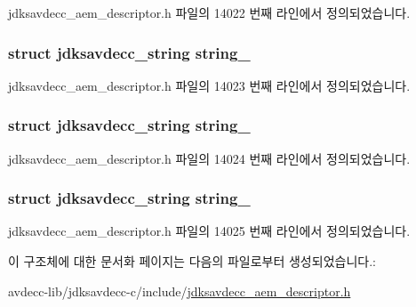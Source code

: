 jdksavdecc\+\_\+aem\+\_\+descriptor.\+h 파일의 14022 번째 라인에서 정의되었습니다.

\subsubsection[{\texorpdfstring{string\+\_\+4}{string_4}}]{\setlength{\rightskip}{0pt plus 5cm}struct {\bf jdksavdecc\+\_\+string} string\+\_}\hypertarget{structjdksavdecc__descriptor__strings_a12315da39ae0832d37bc88da374e32b7}{}\label{structjdksavdecc__descriptor__strings_a12315da39ae0832d37bc88da374e32b7}


jdksavdecc\+\_\+aem\+\_\+descriptor.\+h 파일의 14023 번째 라인에서 정의되었습니다.

\subsubsection[{\texorpdfstring{string\+\_\+5}{string_5}}]{\setlength{\rightskip}{0pt plus 5cm}struct {\bf jdksavdecc\+\_\+string} string\+\_}\hypertarget{structjdksavdecc__descriptor__strings_a6f6720d47d1d4d6896b173f8a3509c58}{}\label{structjdksavdecc__descriptor__strings_a6f6720d47d1d4d6896b173f8a3509c58}


jdksavdecc\+\_\+aem\+\_\+descriptor.\+h 파일의 14024 번째 라인에서 정의되었습니다.

\subsubsection[{\texorpdfstring{string\+\_\+6}{string_6}}]{\setlength{\rightskip}{0pt plus 5cm}struct {\bf jdksavdecc\+\_\+string} string\+\_}\hypertarget{structjdksavdecc__descriptor__strings_a00c3c7fc6e427751d1a54b0d38513ad3}{}\label{structjdksavdecc__descriptor__strings_a00c3c7fc6e427751d1a54b0d38513ad3}


jdksavdecc\+\_\+aem\+\_\+descriptor.\+h 파일의 14025 번째 라인에서 정의되었습니다.



이 구조체에 대한 문서화 페이지는 다음의 파일로부터 생성되었습니다.\+:\begin{DoxyCompactItemize}
\item 
avdecc-\/lib/jdksavdecc-\/c/include/\hyperlink{jdksavdecc__aem__descriptor_8h}{jdksavdecc\+\_\+aem\+\_\+descriptor.\+h}\end{DoxyCompactItemize}
